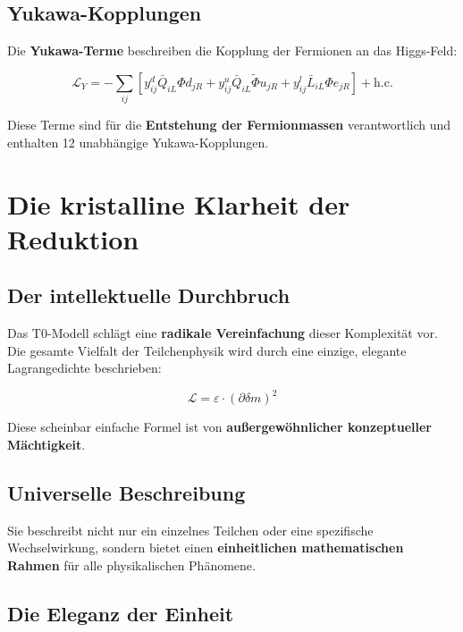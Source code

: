\documentclass[12pt,a4paper]{report}
\begin{document}
	\subsection{Yukawa-Kopplungen}
	
	Die \textbf{Yukawa-Terme} beschreiben die Kopplung der Fermionen an das Higgs-Feld:
	
	\begin{equation}
		\mathcal{L}_Y = -\sum_{ij} [y_{ij}^d \bar{Q}_{iL} \Phi d_{jR} + y_{ij}^u \bar{Q}_{iL} \tilde{\Phi} u_{jR} + y_{ij}^l \bar{L}_{iL} \Phi e_{jR}] + \text{h.c.}
	\end{equation}
	
	Diese Terme sind für die \textbf{Entstehung der Fermionmassen} verantwortlich und enthalten 12 unabhängige Yukawa-Kopplungen.
	
	\section{Die kristalline Klarheit der Reduktion}
	
	\subsection{Der intellektuelle Durchbruch}
	
	Das T0-Modell schlägt eine \textbf{radikale Vereinfachung} dieser Komplexität vor. Die gesamte Vielfalt der Teilchenphysik wird durch eine einzige, elegante Lagrangedichte beschrieben:
	
	\begin{equation}
		\mathcal{L} = \varepsilon \cdot (\partial\delta m)^2
	\end{equation}
	
	Diese scheinbar einfache Formel ist von \textbf{außergewöhnlicher konzeptueller Mächtigkeit}.
	
	\subsection{Universelle Beschreibung}
	
	Sie beschreibt nicht nur ein einzelnes Teilchen oder eine spezifische Wechselwirkung, sondern bietet einen \textbf{einheitlichen mathematischen Rahmen} für alle physikalischen Phänomene.
	
	\subsection{Die Eleganz der Einheit}
	
\end{document}
